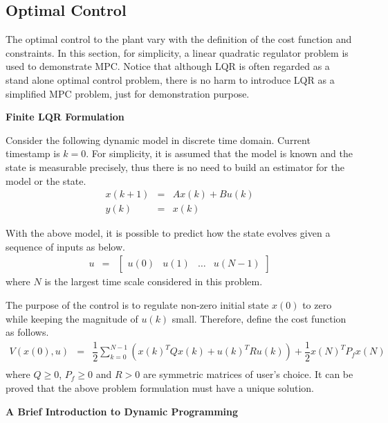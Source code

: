 \subsection{Optimal Control}

The optimal control to the plant vary with the definition of the cost function and constraints. In this section, for simplicity, a linear quadratic regulator problem is used to demonstrate MPC. Notice that although LQR is often regarded as a stand alone optimal control problem, there is no harm to introduce LQR as a simplified MPC problem, just for demonstration purpose.

\vspace{0.1in}
\noindent \textbf{Finite LQR Formulation}
\vspace{0.1in}

Consider the following dynamic model in discrete time domain. Current timestamp is $k=0$. For simplicity, it is assumed that the model is known and the state is measurable precisely, thus there is no need to build an estimator for the model or the state.
\begin{eqnarray}
  x(k+1) &=& Ax(k) + Bu(k) \label{eq:lqrexp1} \\
  y(k) &=& x(k) \label{eq:lqrexp2}
\end{eqnarray}

With the above model, it is possible to predict how the state evolves given a sequence of inputs as below.
\begin{eqnarray}
  u &=& \left[\begin{array}{cccc}
                u(0) & u(1) & \ldots & u(N-1) \nonumber
              \end{array}\right]
\end{eqnarray}
where $N$ is the largest time scale considered in this problem.

The purpose of the control is to regulate non-zero initial state $x(0)$ to zero while keeping the magnitude of $u(k)$ small. Therefore, define the cost function as follows.
\begin{eqnarray}
  V\left(x(0), u\right) &=& \dfrac{1}{2}\sum_{k=0}^{N-1}\left(x(k)^TQx(k) + u(k)^TRu(k)\right) + \dfrac{1}{2}x(N)^TP_fx(N) \nonumber \\ \label{eq:lqrexp3}
\end{eqnarray}
where $Q\geq 0$, $P_f \geq0$ and $R>0$ are symmetric matrices of user's choice. It can be proved that the above problem formulation must have a unique solution.

\vspace{0.1in}
\noindent \textbf{A Brief Introduction to Dynamic Programming}
\vspace{0.1in}

